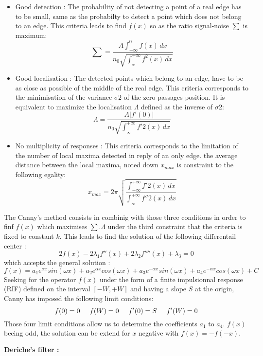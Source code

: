 \begin{itemize}
\item Good detection : The probability of not detecting a point of a real edge has to be small, same as the probabilty to detect a point which does not belong to an edge. 
This criteria leads to find $f(x)$ so as the ratio signal-noise $\sum$ is maximum:
\[
\sum = \frac{A \int_{-\infty}^{0}f(x)\,dx}{n_{0}\sqrt{\int_{_\infty}^{+\infty} f^{2}(x)\,dx}} 
\]
\item Good localisation : The detected points which belong to an edge, have to be as close as possible of the middle of the real edge. This criteria corresponds to the minimisation of the variance $\sigma{2}$ of the zero passages position. It is equivalent to maximize the localisation $\Lambda$ defined as the inverse of $\sigma{2}$:
\[
\Lambda = \frac{A |f'(0)|}{n_{0}\sqrt{\int_{_\infty}^{+\infty} f'{2}(x)\,dx}} 
\]
\item  No multiplicity of responses : This criteria corresponds to the limitation of the number of local maxima detected in reply of an only edge. the average distance between the local maxima, noted down $x_{max}$ is constraint to the following egality:
\[
 x_{max} = 2\pi \sqrt{ \frac{ \int_{-\infty}^{+\infty}f'{2}(x)\,dx}{\int_{_\infty}^{+\infty} f''{2}(x)\,dx }}
\]
\end{itemize}
The Canny's method consists in combinig with those three conditions in order to finf $f(x)$ which maximises $\sum.\Lambda$ under the third constraint that the criteria is fixed to constant $k$. This leads to find the solution of the following differentail center :
\[
2f(x)-2\lambda _{1}f''(x)+2\lambda _{2}f''''(x)+\lambda _{3}=0 
\]
which accepts the general solution :
\[
f(x)=a_{1}e^{\alpha x}sin(\omega x)+a_{2}e^{\alpha x}cos(\omega x) +a_{3}e^{-\alpha x}sin(\omega x) + a_{4}e^{-\alpha x}cos(\omega x) + C 
\]
Seeking for the operator $f(x)$ under the form of a finite impulsionnal response (RIF) defined on the interval $[-W,+W]$ and having a slope $S$ at the origin, Canny has imposed the following limit conditions:
\[
f(0)=0 \hspace{0.5cm}  f(W)=0 \hspace{0.5cm}  f'(0)=S \hspace{0.5cm}  f'(W)=0 
\]
Those four limit conditions allow us to determine the coefficients $a_{1}$ to $a_{4}$. $f(x)$ beeing odd, the solution can be extend for $x$ negative with $f(x)=-f(-x)$. 

\medskip

{\large \bf  Deriche's filter : }

